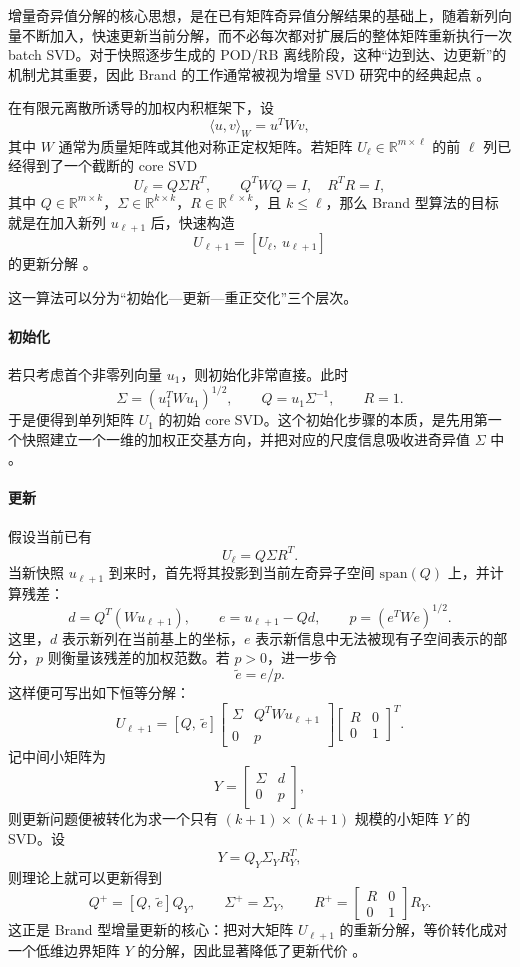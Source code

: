 增量奇异值分解的核心思想，是在已有矩阵奇异值分解结果的基础上，随着新列向量不断加入，快速更新当前分解，而不必每次都对扩展后的整体矩阵重新执行一次 batch SVD。对于快照逐步生成的 POD/RB 离线阶段，这种“边到达、边更新”的机制尤其重要，因此 Brand 的工作通常被视为增量 SVD 研究中的经典起点 \cite{brand2002,brand2006,zhang2022}。

在有限元离散所诱导的加权内积框架下，设
\[
\langle u,v\rangle_W=u^T W v,
\]
其中 $W$ 通常为质量矩阵或其他对称正定权矩阵。若矩阵 $U_\ell\in\mathbb R^{m\times \ell}$ 的前 $\ell$ 列已经得到了一个截断的 core SVD
\[
U_\ell = Q\Sigma R^T,\qquad Q^T W Q = I,\quad R^T R = I,
\]
其中 $Q\in\mathbb R^{m\times k}$，$\Sigma\in\mathbb R^{k\times k}$，$R\in\mathbb R^{\ell\times k}$，且 $k\le \ell$，那么 Brand 型算法的目标就是在加入新列 $u_{\ell+1}$ 后，快速构造
\[
U_{\ell+1}=[U_\ell,\ u_{\ell+1}]
\]
的更新分解 \cite{brand2002,zhang2022}。

这一算法可以分为“初始化—更新—重正交化”三个层次。

\paragraph{初始化}

若只考虑首个非零列向量 $u_1$，则初始化非常直接。此时
\[
\Sigma = (u_1^T W u_1)^{1/2},\qquad
Q=u_1\Sigma^{-1},\qquad
R=1.
\]
于是便得到单列矩阵 $U_1$ 的初始 core SVD。这个初始化步骤的本质，是先用第一个快照建立一个一维的加权正交基方向，并把对应的尺度信息吸收进奇异值 $\Sigma$ 中 \cite{zhang2022}。

\paragraph{更新}

假设当前已有
\[
U_\ell = Q\Sigma R^T.
\]
当新快照 $u_{\ell+1}$ 到来时，首先将其投影到当前左奇异子空间 $\mathrm{span}(Q)$ 上，并计算残差：
\[
d = Q^T(Wu_{\ell+1}),\qquad
e = u_{\ell+1}-Qd,\qquad
p=(e^TWe)^{1/2}.
\]
这里，$d$ 表示新列在当前基上的坐标，$e$ 表示新信息中无法被现有子空间表示的部分，$p$ 则衡量该残差的加权范数。若 $p>0$，进一步令
\[
\tilde e = e/p.
\]
这样便可写出如下恒等分解：
\[
U_{\ell+1}
=
[Q,\ \tilde e]
\begin{bmatrix}
\Sigma & Q^TWu_{\ell+1}\\
0 & p
\end{bmatrix}
\begin{bmatrix}
R & 0\\
0 & 1
\end{bmatrix}^{T}.
\]
记中间小矩阵为
\[
Y=
\begin{bmatrix}
\Sigma & d\\
0 & p
\end{bmatrix},
\]
则更新问题便被转化为求一个只有 $(k+1)\times(k+1)$ 规模的小矩阵 $Y$ 的 SVD。设
\[
Y = Q_Y\Sigma_Y R_Y^T,
\]
则理论上就可以更新得到
\[
Q^+=[Q,\ \tilde e]Q_Y,\qquad
\Sigma^+=\Sigma_Y,\qquad
R^+=
\begin{bmatrix}
R & 0\\
0 & 1
\end{bmatrix}R_Y.
\]
这正是 Brand 型增量更新的核心：把对大矩阵 $U_{\ell+1}$ 的重新分解，等价转化成对一个低维边界矩阵 $Y$ 的分解，因此显著降低了更新代价 \cite{brand2002,zhang2022}。

